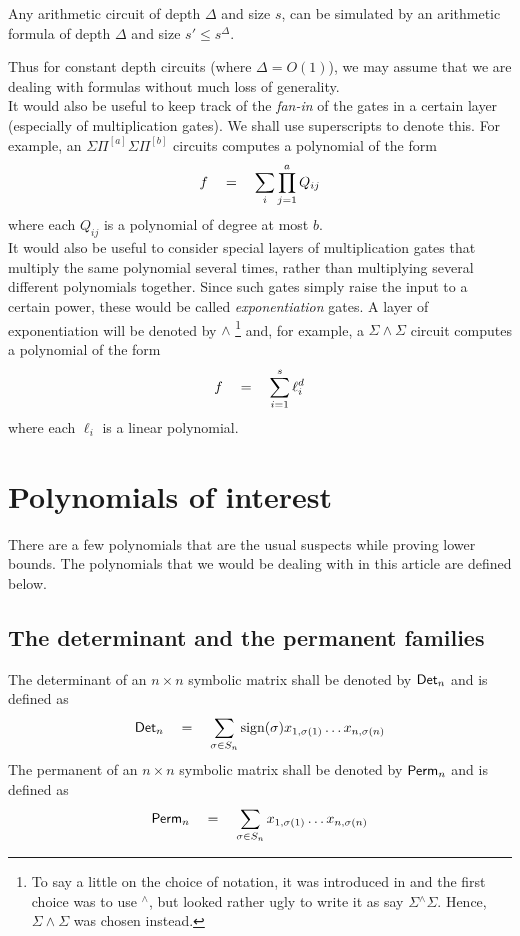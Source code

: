 \begin{fact}
Any arithmetic circuit of depth $\Delta$ and size $s$, can be simulated by an arithmetic formula of depth $\Delta$ and size $s' \leq s^{\Delta}$. 
\end{fact}

Thus for constant depth circuits (where $\Delta = O(1)$), we may assume that we are dealing with formulas without much loss of generality. \\

It would also be useful to keep track of the \emph{fan-in} of the gates in a certain layer (especially of multiplication gates). We shall use superscripts to denote this. For example, an $\Sigma\Pi^{[a]}\Sigma\Pi^{[b]}$ circuits computes a polynomial of the form
\[
f \quad = \quad \sum_i \prod_{j=1}^a Q_{ij}
\]
where each $Q_{ij}$ is a polynomial of degree at most $b$. \\

It would also be useful to consider special layers of multiplication gates that multiply the same polynomial several times, rather than multiplying several different polynomials together. Since such gates simply raise the input to a certain power, these would be called \emph{exponentiation} gates. A layer of exponentiation will be denoted by $\wedge$ \footnote{To say a little on the choice of notation, it was introduced in \cite{gkks13b} and the first choice was to use ${}^{\wedge}$, but looked rather ugly to write it as say $\Sigma{}^{\wedge}\Sigma$. Hence, $\Sigma\!\wedge\!\Sigma$  was chosen instead. } and, for example, a $\Sigma\!\wedge\!\Sigma$ circuit computes a polynomial of the form 
\[
f\quad = \quad \sum_{i=1}^s \ell_{i}^d
\]
where each $\ell_i$ is a linear polynomial. 


\section{Polynomials of interest}

There are a few polynomials that are the usual suspects while proving lower bounds. The polynomials that we would be dealing with in this article are defined below. 

\subsection*{The determinant and the permanent families}

The determinant of an $n\times n$ symbolic matrix shall be denoted by $\mathsf{Det}_n$ and is defined as
\[
\mathsf{Det}_n \quad = \quad \sum_{\sigma \in S_n} \text{sign}(\sigma) x_{1,\sigma(1)}\dots x_{n,\sigma(n)}
\]
The permanent of an $n\times n$ symbolic matrix shall be denoted by $\mathsf{Perm}_n$ and is defined as
\[
\mathsf{Perm}_n \quad = \quad \sum_{\sigma \in S_n}x_{1,\sigma(1)}\dots x_{n,\sigma(n)}
\]

